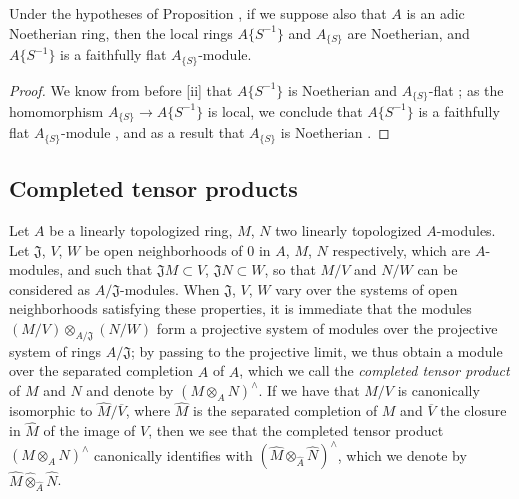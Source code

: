 \begin{corollary}[7.6.18]
\label{0.7.6.18}
Under the hypotheses of Proposition , if we suppose also that
$A$ is an adic Noetherian ring, then the local rings $A\{S^{-1}\}$ and $A_{\{S\}}$ are Noetherian,
and $A\{S^{-1}\}$ is a faithfully flat $A_{\{S\}}$-module.
\end{corollary}

\begin{proof}
We know from before [ii] that $A\{S^{-1}\}$ is Noetherian and
$A_{\{S\}}$-flat ; as the homomorphism $A_{\{S\}}\to A\{S^{-1}\}$
is local, we conclude that $A\{S^{-1}\}$ is a faithfully flat $A_{\{S\}}$-module
, and as a result that $A_{\{S\}}$ is Noetherian .
\end{proof}

\subsection{Completed tensor products}
\label{subsection:0.7.7}

\begin{env}[7.7.1]
\label{0.7.7.1}
Let $A$ be a linearly topologized ring, $M$, $N$ two linearly topologized $A$-modules. Let
$\mathfrak{J}$, $V$, $W$ be open neighborhoods of $0$ in $A$, $M$, $N$ respectively, which are
$A$-modules, and such that $\mathfrak{J}M\subset V$, $\mathfrak{J}N\subset W$, so that
$M/V$ and $N/W$ can be considered as $A/\mathfrak{J}$-modules. When $\mathfrak{J}$, $V$, $W$
vary over the systems of open neighborhoods satisfying these properties, it is immediate that the
modules $(M/V)\otimes_{A/\mathfrak{J}}(N/W)$ form a projective system of modules
over the projective system of rings $A/\mathfrak{J}$; by passing to the projective limit, we
thus obtain a module over the separated completion $\widehat{A}$ of $A$, which we call the
\emph{completed tensor product} of $M$ and $N$ and denote by $(M\otimes_A N)^\wedge$. If we have
that $M/V$ is canonically isomorphic to $\widehat{M}/\overline{V}$, where $\widehat{M}$ is the
separated completion of $M$ and $\overline{V}$ the closure in $\widehat{M}$ of the image of $V$,
then we see that the completed tensor product $(M\otimes_A N)^\wedge$ canonically identifies with
$(\widehat{M}\otimes_{\widehat{A}}\widehat{N})^\wedge$, which we denote by $\widehat{M}\widehat{\otimes}_{\widehat{A}}\widehat{N}$.
\end{env}


